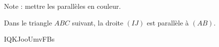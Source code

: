 



Note : mettre les parallèles en couleur.

\begin{theorem}
    Dans le triangle \( ABC\) suivant, la droite \( (IJ)\) est parallèle à \( (AB)\).

IQKJooUmvFBs

\end{theorem}





